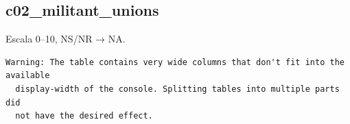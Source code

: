 \documentclass[
  letterpaper,
  DIV=11,
  numbers=noendperiod]{scrreprt}
\newenvironment{Shaded}{\begin{snugshade}}{\end{snugshade}}
\newcommand{\FunctionTok}[1]{\textcolor[rgb]{0.28,0.35,0.67}{#1}}
\newcommand{\NormalTok}[1]{\textcolor[rgb]{0.00,0.23,0.31}{#1}}
\newcommand{\SpecialCharTok}[1]{\textcolor[rgb]{0.37,0.37,0.37}{#1}}
\begin{document}
\subsection{c02\_militant\_unions}\label{c02_militant_unions}

Escala 0--10, NS/NR → NA.

\begin{Shaded}
\end{Shaded}

\begin{verbatim}
Warning: The table contains very wide columns that don't fit into the available
  display-width of the console. Splitting tables into multiple parts did
  not have the desired effect.
\end{verbatim}
\end{document}
